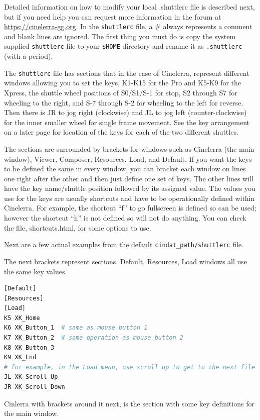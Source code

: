 Detailed information on how to modify your local .shuttlerc file is described next, but if you need help you can request more information in the forum at \url{https://cinelerra-gg.org}. In the \texttt{shuttlerc} file, a \# always represents a comment and blank lines are ignored.  The first thing you must do is copy the system supplied \texttt{shuttlerc} file to your \texttt{\$HOME} directory and rename it as \texttt{.shuttlerc} (with a period). 

The \texttt{shuttlerc} file has sections that in the case of Cinelerra, represent different windows allowing you to set the keys, K1-K15 for the Pro and K5-K9 for the Xpress, the shuttle wheel positions of S0/S1/S-1 for stop, S2 through S7 for wheeling to the right, and S-7 through S-2 for wheeling to the left for reverse.  Then there is JR to jog right (clockwise) and JL to jog left (counter-clockwise) for the inner smaller wheel for single frame movement.  See the key arrangement on a later page for location of the keys for each of the two different shuttles.

The sections are surrounded by brackets for windows such as Cinelerra (the main window), Viewer, Composer, Resources, Load, and Default.  If you want the keys to be defined the same in every window, you can bracket each window on lines one right after the other and then just define one set of keys.  The other lines will have the key name/shuttle position followed by its assigned value.  The values you use for the keys are usually shortcuts and have to be operationally defined within Cinelerra. For example, the shortcut “f” to go fullscreen is defined so can be used; however the shortcut “h” is not defined so will not do anything.  You can check the file, shortcuts.html, for some options to use.

Next are a few actual examples from the default \texttt{{cindat\_path}/shuttlerc} file.

\noindent The next brackets represent sections. Default, Resources, Load windows all use the same key values.

\begin{lstlisting}[language=Bash]
[Default] 
[Resources] 
[Load] 
K5 XK_Home 
K6 XK_Button_1	# same as mouse button 1 
K7 XK_Button_2	# same operation as mouse button 2
K8 XK_Button_3 
K9 XK_End 
# for example, in the Load menu, use scroll up to get to the next file name 
JL XK_Scroll_Up	
JR XK_Scroll_Down
\end{lstlisting}

\noindent Cinlerra with brackets around it next, is the section with some key definitions for the main window.

